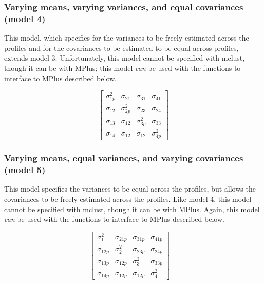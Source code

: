 \documentclass[]{msu-thesis}
\theoremstyle{definition}
\theoremstyle{definition}
\theoremstyle{definition}
\theoremstyle{remark}
\begin{document}
\subsubsection{Varying means, varying variances, and equal covariances
(model
4)}\label{varying-means-varying-variances-and-equal-covariances-model-4}

This model, which specifies for the variances to be freely estimated
across the profiles and for the covariances to be estimated to be equal
across profiles, extends model 3. Unfortunately, this model cannot be
specified with mclust, though it can be with MPlus; this model
\emph{can} be used with the functions to interface to MPlus described
below.

\[
\left[ \begin{matrix} { \sigma  }_{ 1p }^{ 2 } & { \sigma  }_{ 21 } & { \sigma  }_{ 31 } & { \sigma  }_{ 41 } \\ { \sigma  }_{ 12 } & { \sigma  }_{ 2p }^{ 2 } & { \sigma  }_{ 23 } & { \sigma  }_{ 24 } \\ { \sigma  }_{ 13 } & { \sigma  }_{ 12 } & { \sigma  }_{ 3p }^{ 2 } & { \sigma  }_{ 33 } \\ { \sigma  }_{ 14 } & { \sigma  }_{ 12 } & { \sigma  }_{ 12 } & { \sigma  }_{ 4p }^{ 2 } \end{matrix} \right] 
\]

\subsubsection{Varying means, equal variances, and varying covariances
(model
5)}\label{varying-means-equal-variances-and-varying-covariances-model-5}

This model specifies the variances to be equal across the profiles, but
allows the covariances to be freely estimated across the profiles. Like
model 4, this model cannot be specified with mclust, though it can be
with MPlus. Again, this model \emph{can} be used with the functions to
interface to MPlus described below.

\[
\left[ \begin{matrix} { \sigma  }_{ 1 }^{ 2 } & { \sigma  }_{ 21p } & { \sigma  }_{ 31p } & { \sigma  }_{ 41p } \\ { \sigma  }_{ 12p } & { \sigma  }_{ 2 }^{ 2 } & { \sigma  }_{ 23p } & { \sigma  }_{ 24p } \\ { \sigma  }_{ 13p } & { \sigma  }_{ 12p } & { \sigma  }_{ 3 }^{ 2 } & { \sigma  }_{ 33p } \\ { \sigma  }_{ 14p } & { \sigma  }_{ 12p } & { \sigma  }_{ 12p } & { \sigma  }_{ 4 }^{ 2 } \end{matrix} \right] \quad 
\]
\end{document}
